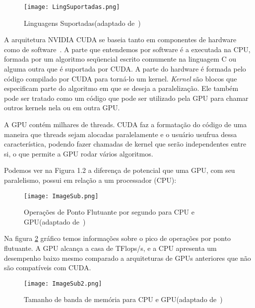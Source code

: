 \begin{figure}[htb]
	\begin{center}
	\centering
			\texttt{[image: LingSuportadas.png]}
	\label{fig: lingSuportadas}
	\caption{Linguagens Suportadas(adaptado de~\citep{cuda})}
	\end{center}
\end{figure}

A arquitetura NVIDIA CUDA se baseia tanto em componentes de hardware como de software~\citep{cuda}. A parte que entendemos por software é a executada na CPU, formada por um algoritmo seqüencial escrito comumente na linguagem C ou alguma outra que é suportada por CUDA. A parte do hardware é formada pelo código compilado por CUDA para torná-lo um kernel. \textit{Kernel} são blocos que especificam parte do algoritmo em que se deseja a
paralelização. Ele também pode ser tratado como um código que pode ser utilizado pela GPU para chamar outros kernels nela ou em outra GPU.

A GPU contém milhares de threads. CUDA faz a formatação do código de uma maneira que threads sejam alocadas paralelamente e o usuário usufrua dessa característica, podendo fazer chamadas de kernel que serão independentes entre si, o que permite a GPU rodar vários algoritmos.

Podemos ver na Figura 1.2 a diferença de potencial que uma GPU, com seu paralelismo, possui em relação a um processador (CPU):

\begin{figure}[!htb]
	\begin{center}
	\centering
			\texttt{[image: ImageSub.png]}
	\label{fig: graficosCuda1}
	\caption{Operações de Ponto Flutuante por segundo para CPU e GPU(adaptado de~\citep{cuda})}
	\end{center}
\end{figure}

Na figura \ref{fig: graficosCuda1} gráfico temos informações sobre o pico de operações por ponto flutuante. A GPU alcança a casa de TFlops/s, e a CPU apresenta um desempenho baixo mesmo comparado a arquiteturas de GPUs anteriores que não são compatíveis com CUDA.

\begin{figure}[!htb]
	\begin{center}
	\centering
			\texttt{[image: ImageSub2.png]}
	\label{fig: graficosCuda2}
	\caption{Tamanho de banda de memória para CPU e GPU(adaptado de~\citep{cuda})}
	\end{center}
\end{figure}


